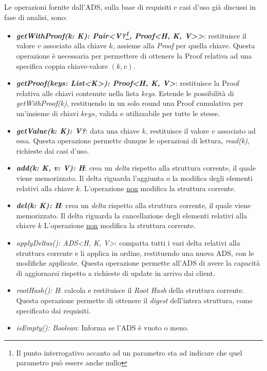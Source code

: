 		Le operazioni fornite dall'ADS, sulla base di requisiti e casi d'uso già discussi in fase di analisi, sono:
		\begin{itemize}
			\item \textbf{\textit{getWithProof(k: K): Pair<V?\footnote{Il punto interrogativo accanto ad un parametro sta ad indicare che quel parametro può essere anche nullo}, Proof<H, K, V>>}}: restituisce il valore $ v $ associato alla chiave $ k $, assieme alla \textit{Proof} per quella chiave. Questa operazione è necessaria per permettere di ottenere la Proof relativa ad una specifica coppia chiave-valore $ (k,v) $.
			\item\textbf{ \textit{getProof(keys: List<K>): Proof<H, K, V>}}: restituisce la Proof relativa alle chiavi contenute nella lista \textit{keys}. Estende le possibilità di \textit{getWithProof(k)}, restituendo in un solo round una Proof cumulativa per un'insieme di chiavi $ keys $, valida e utilizzabile per tutte le stesse. 
			\item \textbf{\textit{getValue(k: K): V?}}: data una chiave $ k $, restituisce il valore $ v $ associato ad essa. Questa operazione permette dunque le operazioni di lettura, \textit{read(k)}, richieste dai casi d'uso.
			\item \textbf{\textit{add(k: K, v: V): H}}: crea un \textit{delta} rispetto alla struttura corrente, il quale viene memorizzato. Il delta riguarda l'aggiunta o la modifica degli elementi relativi alla chiave $ k $. L'operazione \underline{non} modifica la struttura corrente.
			\item \textbf{\textit{del(k: K): H}}: crea un \textit{delta} rispetto alla struttura corrente, il quale viene memorizzato. Il delta riguarda la cancellazione degli elementi relativi alla chiave $ k $ L'operazione \underline{non} modifica la struttura corrente.
			\item \textit{applyDeltas(): ADS<H, K, V>}: compatta tutti i vari delta relativi alla struttura corrente e li applica in ordine, restituendo una nuova ADS, con le modifiche applicate. Questa operazione permette all'ADS di avere la capacità di aggiornarsi rispetto a richieste di update in arrivo dai client.
			\item \textit{rootHash(): H}: calcola e restituisce il \textit{Root Hash} della struttura corrente. Questa operazione permette di ottenere il \textit{digest} dell'intera struttura, come specificato dai requisiti.
			\item \textit{isEmpty(): Boolean}: Informa se l'ADS è vuoto o meno.
		\end{itemize}
	

